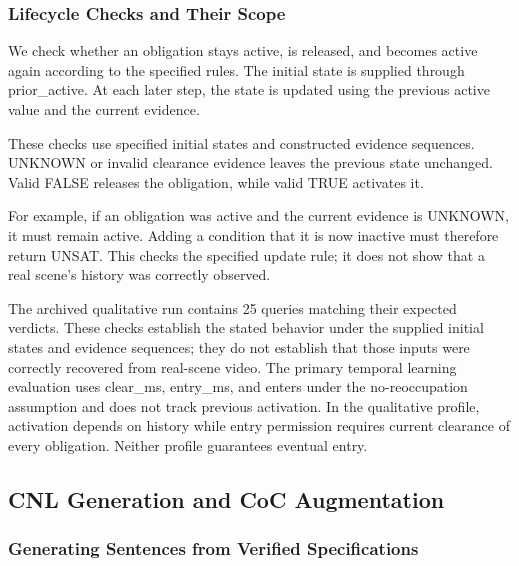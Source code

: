 \documentclass[nolineno]{ieeeaccess}
\begin{document}
\subsubsection{Lifecycle Checks and Their Scope}

We check whether an obligation stays active, is released, and becomes active again according to the specified rules. The initial state is supplied through {\ttfamily{}\selectfont\footnotesize prior\_\allowbreak active}. At each later step, the state is updated using the previous {\ttfamily{}\selectfont\footnotesize active} value and the current evidence.\par
%
These checks use specified initial states and constructed evidence sequences. UNKNOWN or invalid clearance evidence leaves the previous state unchanged. Valid FALSE releases the obligation, while valid TRUE activates it.\par
%
For example, if an obligation was active and the current evidence is UNKNOWN, it must remain active. Adding a condition that it is now inactive must therefore return UNSAT. This checks the specified update rule; it does not show that a real scene's history was correctly observed.\par

The archived qualitative run contains 25 queries matching their expected verdicts. These checks establish the stated behavior under the supplied initial states and evidence sequences; they do not establish that those inputs were correctly recovered from real-scene video. The primary temporal learning evaluation uses {\ttfamily{}\selectfont\footnotesize clear\_\allowbreak ms}, {\ttfamily{}\selectfont\footnotesize entry\_\allowbreak ms}, and {\ttfamily{}\selectfont\footnotesize enters} under the no-reoccupation assumption and does not track previous activation. In the qualitative profile, activation depends on history while entry permission requires current clearance of every obligation. Neither profile guarantees eventual entry.\par


\subsection{CNL Generation and CoC Augmentation}\label{sec:cnl}

\subsubsection{Generating Sentences from Verified Specifications}
\end{document}
